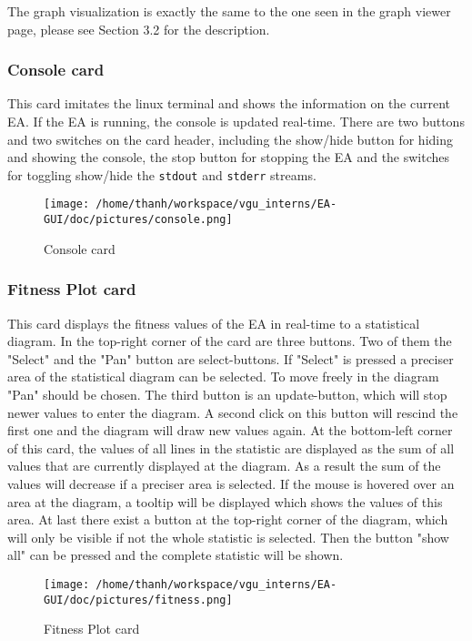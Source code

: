 \documentclass[11pt,a4paper]{article}
\begin{document}
The graph visualization is exactly the same to the one seen in the graph viewer page, please see Section 3.2 for the description.
\subsubsection{Console card}
This card imitates the linux terminal and shows the information on the current EA. If the EA is running, the console is updated real-time. There are two buttons and two switches on the card header, including the show/hide button for hiding and showing the console, the stop button for stopping the EA and the switches for toggling show/hide the \texttt{stdout} and \texttt{stderr} streams.
\begin{figure}[htp]
\centering
\texttt{[image: /home/thanh/workspace/vgu\_interns/EA-GUI/doc/pictures/console.png]}
\caption{Console card}
\label{}
\end{figure}
\subsubsection{Fitness Plot card}
This card displays the fitness values of the EA in real-time to a statistical diagram. In the top-right corner of the card are three buttons. Two of them the "Select" and the "Pan" button are select-buttons. If "Select" is pressed a preciser area of the statistical diagram can be selected. To move freely in the diagram "Pan" should be chosen. The third button is an update-button, which will stop newer values to enter the diagram. A second click on this button will rescind the first one and the diagram will draw new values again. At the bottom-left corner of this card, the values of all lines in the statistic are displayed as the sum of all values that are currently displayed at the diagram. As a result the sum of the values will decrease if a preciser area is selected. If the mouse is hovered over an area at the diagram, a tooltip will be displayed which shows the values of this area. At last there exist a button at the top-right corner of the diagram, which will only be visible if not the whole statistic is selected. Then the button "show all" can be pressed and the complete statistic will be shown.
\begin{figure}[htp]
\centering
\texttt{[image: /home/thanh/workspace/vgu\_interns/EA-GUI/doc/pictures/fitness.png]}
\caption{Fitness Plot card}
\label{}
\end{figure}
\end{document}
